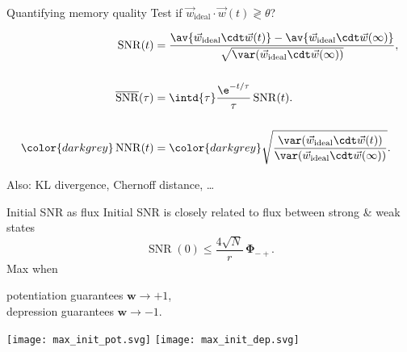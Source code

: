 \documentclass[final]{beamer}%
\DeclareMathOperator{\SNR}{SNR}
\DeclareMathOperator{\snr}{SNR}
\newcommand{\snrb}{\overline{\snr}}
\newcommand{\syn}{\vec{w}}
\newcommand{\synid}{\syn_\text{ideal}}
\newcommand{\w}{\mathbf{w}}
\newcommand{\F}{\boldsymbol{\Phi}}
\begin{document}
\begin{frame}{Quantifying memory quality}
%
 Test if $\synid \cdot \syn(t) \gtrless \theta$?


 \vp
 \parbox[t]{0.4\linewidth}{%
 }
 \parbox[t]{0.55\linewidth}{%
 \vspace{-\baselineskip}
 \begin{equation*}
   \begin{aligned}
     \snr(t) &= \frac{ \av{\synid\cdt\syn(t)} - \av{\synid\cdt\syn(\infty)} }{ \sqrt{\var(\synid\cdt\syn(\infty))}},
     \\[\baselineskip]
     \snrb(\tau) &= \intd{\tau} \frac{\e^{-t/\tau}}{\tau} \snr(t).
     \\[\baselineskip]
     \color{darkgrey} \operatorname{NNR}(t) &= \color{darkgrey} \sqrt{\frac{ \var(\synid\cdt\syn(t)) }{ \var(\synid\cdt\syn(\infty)) }}.
   \end{aligned}
 \end{equation*}
 }
 Also: KL divergence, Chernoff distance, \ldots
%
\end{frame}


\begin{frame}{Initial SNR as flux}
%
 Initial SNR is closely related to flux between strong \& weak states
 \begin{equation*}
   \SNR(0) \leq \frac{4\sqrt{N}}{r}\,\F_{-+}.
 \end{equation*}
 Max when {\parbox[t]{8cm}{potentiation guarantees $\w\to+1$,\\
 depression guarantees $\w\to-1$.}}
 \begin{center}
   \texttt{[image: max\_init\_pot.svg]}
   \hp \hp
   \texttt{[image: max\_init\_dep.svg]}
 \end{center}
%
\end{frame}
\end{document}

